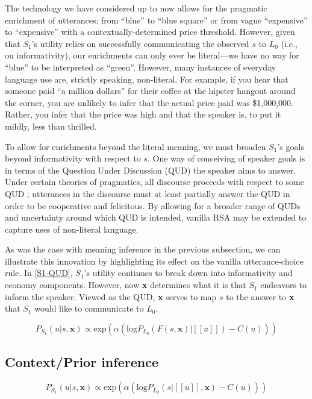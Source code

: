 \documentclass{sp}
\newcommand{\sem}[1]{\ensuremath{[\![#1]\!]}}
\begin{document}
The technology we have considered up to now allows for the pragmatic enrichment of utterances: from ``blue'' to ``blue square'' or from vague ``expensive'' to ``expensive'' with a contextually-determined price threshold. However, given that $S_1$'s utility relies on successfully communicating the observed $s$ to $L_0$ (i.e., on informativity), our enrichments can only ever be literal---we have no way for ``blue'' to be interpreted as ``green''. However, many instances of everyday language use are, strictly speaking, non-literal. For example, if you hear that someone paid ``a million dollars'' for their coffee at the hipster hangout around the corner, you are unlikely to infer that the actual price paid was \$1,000,000. Rather, you infer that the price was high and that the speaker is, to put it mildly, less than thrilled.

To allow for enrichments beyond the literal meaning, we must broaden $S_1$'s goals beyond informativity with respect to $s$. One way of conceiving of speaker goals is in terms of the Question Under Discussion (QUD) the speaker aims to answer. Under certain theories of pragmatics, all discourse proceeds with respect to some QUD \citep{roberts2012}; utterances in the discourse must at least partially answer the QUD in order to be cooperative and felicitous. By allowing for a broader range of QUDs and uncertainty around which QUD is intended, vanilla RSA may be extended to capture uses of non-literal language. 

As was the case with meaning inference in the previous subsection, we can illustrate this innovation by highlighting its effect on the vanilla utterance-choice rule. In \eqref{S1-QUD}, $S_1$'s utility continues to break down into informativity and economy components. However, now \textbf{x} determines what it is that $S_1$ endeavors to inform the speaker. Viewed as the QUD, \textbf{x} serves to map $s$ to the answer to \textbf{x} that $S_1$ would like to communicate to $L_0$.

\begin{equation} \label{S1-QUD}
P_{S_1}(u|s, \textbf{x}) \propto \textrm{exp}(\alpha (\textrm{log}P_{L_0}(F(s,\textbf{x})|\sem{u}) - C(u)))
\end{equation}

\subsection{Context/Prior inference}

$$P_{S_1}(u|s, \textbf{x}) \propto \textrm{exp}(\alpha (\textrm{log}P_{L_0}(s|\sem{u}, \textbf{x}) - C(u)))$$
\end{document}
